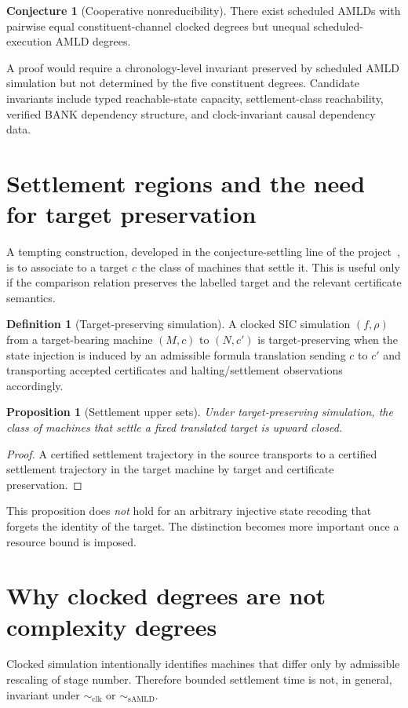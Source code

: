 \documentclass[11pt]{article}
\newtheorem{proposition}[theorem]{Proposition}
\theoremstyle{definition}
\newtheorem{definition}[theorem]{Definition}
\newtheorem{conjecture}[theorem]{Conjecture}
\newcommand{\simclk}{\sim_{\mathrm{clk}}}
\newcommand{\simamld}{\sim_{\mathrm{sAMLD}}}
\begin{document}
\begin{conjecture}[Cooperative nonreducibility]
There exist scheduled AMLDs with pairwise equal constituent-channel clocked degrees but unequal scheduled-execution AMLD degrees.
\end{conjecture}

A proof would require a chronology-level invariant preserved by scheduled AMLD simulation but not determined by the five constituent degrees. Candidate invariants include typed reachable-state capacity, settlement-class reachability, verified BANK dependency structure, and clock-invariant causal dependency data.

\section{Settlement regions and the need for target preservation}
A tempting construction, developed in the conjecture-settling line of the project~\cite{TennesonSettling}, is to associate to a target $c$ the class of machines that settle it. This is useful only if the comparison relation preserves the labelled target and the relevant certificate semantics.

\begin{definition}[Target-preserving simulation]
A clocked SIC simulation $(f,\rho)$ from a target-bearing machine $(M,c)$ to $(N,c')$ is target-preserving when the state injection is induced by an admissible formula translation sending $c$ to $c'$ and transporting accepted certificates and halting/settlement observations accordingly.
\end{definition}

\begin{proposition}[Settlement upper sets]
Under target-preserving simulation, the class of machines that settle a fixed translated target is upward closed.
\end{proposition}

\begin{proof}
A certified settlement trajectory in the source transports to a certified settlement trajectory in the target machine by target and certificate preservation.
\end{proof}

This proposition does \emph{not} hold for an arbitrary injective state recoding that forgets the identity of the target. The distinction becomes more important once a resource bound is imposed.

\section{Why clocked degrees are not complexity degrees}\label{sec:clocknotcomplex}
Clocked simulation intentionally identifies machines that differ only by admissible rescaling of stage number. Therefore bounded settlement time is not, in general, invariant under $\simclk$ or $\simamld$.
\end{document}
